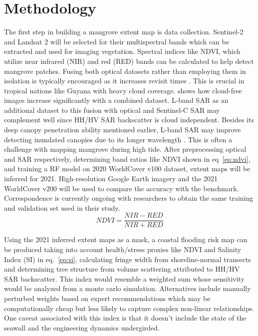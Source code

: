 \documentclass[project-plan]{report-template}
\begin{document}
\section{Methodology}
The first step in building a mangrove extent map is data collection. Sentinel-2 and Landsat 2 will be selected for their multispectral bands which can be extracted and used for imaging vegetation. Spectral indices like NDVI, which utilize near infrared (NIR) and red (RED) bands can be calculated to help detect mangrove patches. Fusing both optical datasets rather than employing them in isolation is typically encouraged as it increases revisit times \parencite{Claverie2018}. This is crucial in tropical nations like Guyana with heavy cloud coverage. \textcite{Chan2024} shows how cloud-free images increase significantly with a combined dataset. L-band SAR as an additional dataset to this fusion with optical and Sentinel-C SAR may complement well since HH/HV SAR backscatter is cloud independent. Besides its deep canopy penetration ability mentioned earlier, L-band SAR may improve detecting inundated canopies due to its longer wavelength \parencite{Meyer2019}. This is often a challenge with mapping mangrove during high tide. After preprocessing optical and SAR respectively, determining band ratios like NDVI shown in eq~\ref{eq:ndvi}, and training a RF model on 2020 WorldCover v100 dataset, extent maps will be inferred for 2021. High-resolution Google Earth imagery and the 2021 WorldCover v200 will be used to compare the accuracy with the \textcite{Chan2024} benchmark. Correspondence is currently ongoing with researchers to obtain the same training and validation set used in their study.
\begin{equation}
    \label{eq:ndvi}
    NDVI = \frac{NIR - RED}{NIR + RED}
\end{equation}

Using the 2021 inferred extent maps as a mask, a coastal flooding risk map can be produced taking into account health/stress proxies like NDVI and Salinity Index (SI) in eq.~\ref{eq:si}, calculating fringe width from shoreline-normal transects and determining tree structure from volume scattering attributed to HH/HV SAR backscatter. This index would resemble a weighted sum whose sensitivity would be analyzed from a monte carlo simulation. Alternatives include manually perturbed weights based on expert recommendations which may be computationally cheap but less likely to capture complex non-linear relationships. One caveat associated with this index is that it doesn’t include the state of the seawall and the engineering dynamics undergirded.
\end{document}
